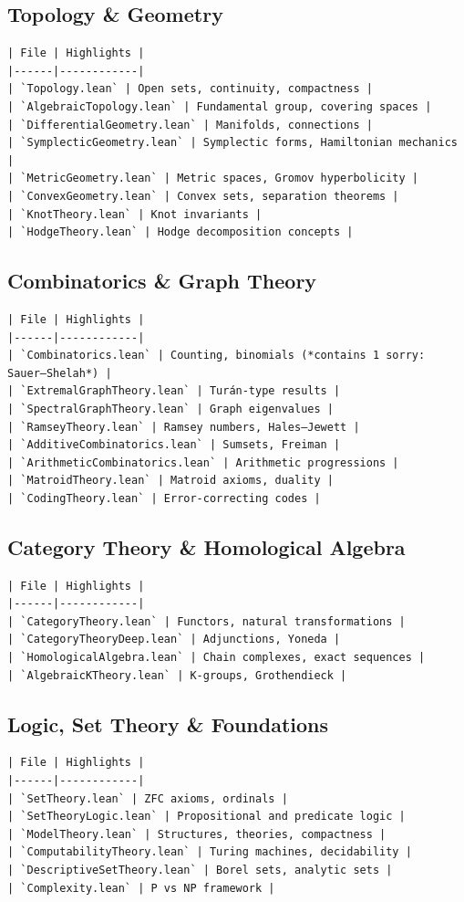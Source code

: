 \documentclass[12pt,a4paper,openany]{book}
\begin{document}
\subsection{Topology \& Geometry}
\begin{verbatim}
| File | Highlights |
|------|------------|
| `Topology.lean` | Open sets, continuity, compactness |
| `AlgebraicTopology.lean` | Fundamental group, covering spaces |
| `DifferentialGeometry.lean` | Manifolds, connections |
| `SymplecticGeometry.lean` | Symplectic forms, Hamiltonian mechanics |
| `MetricGeometry.lean` | Metric spaces, Gromov hyperbolicity |
| `ConvexGeometry.lean` | Convex sets, separation theorems |
| `KnotTheory.lean` | Knot invariants |
| `HodgeTheory.lean` | Hodge decomposition concepts |
\end{verbatim}

\subsection{Combinatorics \& Graph Theory}
\begin{verbatim}
| File | Highlights |
|------|------------|
| `Combinatorics.lean` | Counting, binomials (*contains 1 sorry: Sauer–Shelah*) |
| `ExtremalGraphTheory.lean` | Turán-type results |
| `SpectralGraphTheory.lean` | Graph eigenvalues |
| `RamseyTheory.lean` | Ramsey numbers, Hales–Jewett |
| `AdditiveCombinatorics.lean` | Sumsets, Freiman |
| `ArithmeticCombinatorics.lean` | Arithmetic progressions |
| `MatroidTheory.lean` | Matroid axioms, duality |
| `CodingTheory.lean` | Error-correcting codes |
\end{verbatim}

\subsection{Category Theory \& Homological Algebra}
\begin{verbatim}
| File | Highlights |
|------|------------|
| `CategoryTheory.lean` | Functors, natural transformations |
| `CategoryTheoryDeep.lean` | Adjunctions, Yoneda |
| `HomologicalAlgebra.lean` | Chain complexes, exact sequences |
| `AlgebraicKTheory.lean` | K-groups, Grothendieck |
\end{verbatim}

\subsection{Logic, Set Theory \& Foundations}
\begin{verbatim}
| File | Highlights |
|------|------------|
| `SetTheory.lean` | ZFC axioms, ordinals |
| `SetTheoryLogic.lean` | Propositional and predicate logic |
| `ModelTheory.lean` | Structures, theories, compactness |
| `ComputabilityTheory.lean` | Turing machines, decidability |
| `DescriptiveSetTheory.lean` | Borel sets, analytic sets |
| `Complexity.lean` | P vs NP framework |
\end{verbatim}
\end{document}

